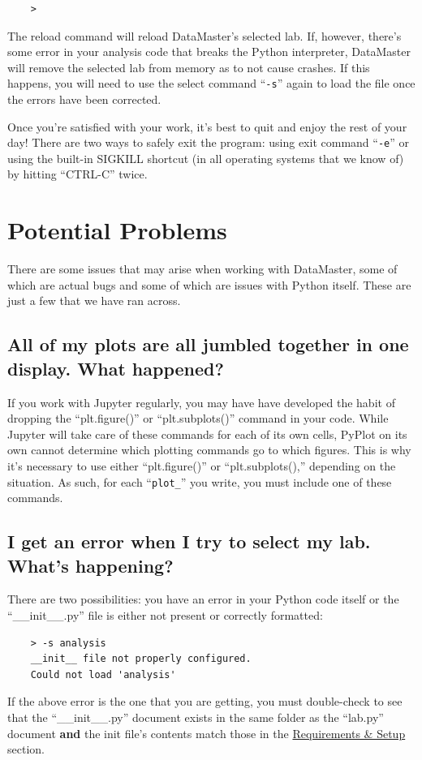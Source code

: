 \documentclass[12pt]{article}
\begin{document}
{\begin{framed}
\begin{lstlisting}
    > 
  \end{lstlisting}
\end{framed}
The reload command will reload DataMaster's selected lab. If, however, there's some error in your analysis code that breaks the Python interpreter, DataMaster will remove the selected lab from memory as to not cause crashes. If this happens, you will need to use the select command ``\texttt{-s}'' again to load the file once the errors have been corrected.

Once you're satisfied with your work, it's best to quit and enjoy the rest of your day! There are two ways to safely exit the program: using exit command ``\texttt{-e}'' or using the built-in SIGKILL shortcut (in all operating systems that we know of) by hitting ``CTRL-C'' twice.

\section*{Potential Problems}
\label{sec:potprob}

There are some issues that may arise when working with DataMaster, some of which are actual bugs and some of which are issues with Python itself. These are just a few that we have ran across.

\subsection*{All of my plots are all jumbled together in one display. What happened?}

If you work with Jupyter regularly, you may have have developed the habit of dropping the ``plt.figure()'' or ``plt.subplots()'' command in your code. While Jupyter will take care of these commands for each of its own cells, PyPlot on its own cannot determine which plotting commands go to which figures. This is why it's necessary to use either ``plt.figure()'' or ``plt.subplots(),'' depending on the situation. As such, for each ``\texttt{plot\_}'' you write, you must include one of these commands.

\subsection*{I get an error when I try to select my lab. What's happening?}

There are two possibilities: you have an error in your Python code itself or the ``\_\_init\_\_.py'' file is either not present or correctly formatted:
\begin{framed}
  \begin{lstlisting}
    > -s analysis
    __init__ file not properly configured.
    Could not load 'analysis'
  \end{lstlisting}
\end{framed}
If the above error is the one that you are getting, you must double-check to see that the ``\_\_init\_\_.py'' document exists in the same folder as the ``lab.py'' document \textbf{and} the init file's contents match those in the \hyperref[sec:reqs]{Requirements \& Setup} section.

}
\end{document}
